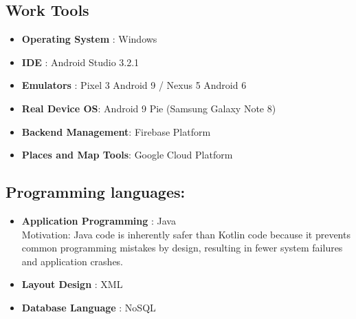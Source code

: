 \subsection{Work Tools}
\begin{itemize}
\item \textbf{Operating System }: Windows 
\item \textbf{IDE }: Android Studio 3.2.1
\item \textbf{Emulators }: Pixel 3 Android 9 / Nexus 5 Android 6
\item \textbf{Real Device OS}: Android 9 Pie (Samsung Galaxy Note 8)
\item \textbf{Backend Management}: Firebase Platform
\item \textbf{Places and Map Tools}: Google Cloud Platform
\end{itemize}
 

\subsection{Programming languages:} 
\begin{itemize}
\item \textbf{Application Programming }: Java\\

Motivation: Java code is inherently safer than Kotlin code because it prevents common programming mistakes by design, resulting in fewer system failures and application crashes.
\item \textbf{Layout Design }: XML
\item \textbf{Database Language }: NoSQL
\end{itemize}

